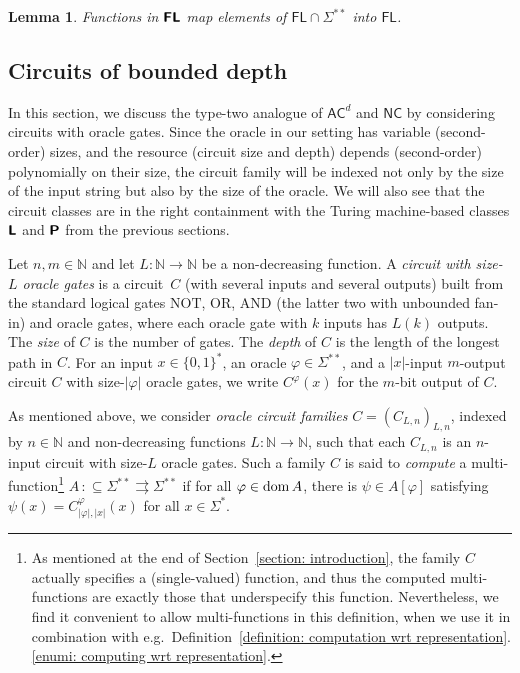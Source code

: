 \documentclass[conference]{IEEEtran}
\newcommand{\N}{\mathbb N}
\newcommand{\classonefont}[1]{\mathsf{#1}}
\newcommand{\classFL}{\classonefont{FL}}
\newcommand{\classNC}{\classonefont{NC}}
\newcommand{\classAC}{\classonefont{AC}}
\newcommand{\classtwofont}[1]{\text{\bfseries \sffamily \upshape #1}}
\newcommand{\classLtwo}{\classtwofont{L}}
\newcommand{\classFLtwo}{\classtwofont{FL}}
\newcommand{\classPtwo}{\classtwofont{P}}
\newcommand{\LM}{\varSigma ^{**}}
\newcommand{\dom}{\mathop{\rm dom}}
\newcommand{\OR}{\mathrm{OR}}
\newcommand{\NOT}{\mathrm{NOT}}
\newcommand{\AND}{\mathrm{AND}}
\newtheorem{lemma}[theorem]{Lemma}
\theoremstyle{definition}
\theoremstyle{remark}
\newcommand{\pcolon}{\mathpunct{\,:\subseteq}}
\begin{document}
\begin{lemma}
\label{lemma:Ltwo-maps-L-to-L}
 Functions in $\classFLtwo$ map 
 elements of $\classFL \cap \LM$
 into $\classFL$.
\end{lemma}


\subsection{Circuits of bounded depth}

In this section, we discuss the type-two analogue of $\classAC ^d$ and $\classNC$ 
by considering circuits with oracle gates.
Since the oracle in our setting has variable (second-order) sizes, 
and the resource (circuit size and depth) 
depends (second-order) polynomially on their size, 
the circuit family will be 
indexed not only by the size of the input string
but also by the size of the oracle. 
We will also see that the circuit classes are 
in the right containment with the 
Turing machine-based classes $\classLtwo$ and $\classPtwo$
from the previous sections. 

Let $n, m \in \N$ and let $L \colon \N \to \N$ be a non-decreasing function.
A \emph{circuit with size-$L$ oracle gates} is a circuit~$C$ 
(with several inputs and several outputs)
built from
the standard logical gates $\NOT$, $\OR$, $\AND$ (the latter two with unbounded fan-in) 
and oracle gates, 
where each oracle gate with $k$ inputs has $L (k)$ outputs.
The \emph{size} of $C$ is the number of gates.
The \emph{depth} of $C$ is the length of the longest path in $C$.
For an input $x \in \{0, 1\} ^*$, an oracle $\varphi \in \LM$, 
and a $|x|$-input $m$-output circuit $C$ with size-$|\varphi|$ oracle gates, 
we write $C^\varphi(x)$ for the $m$-bit output of $C$.

As mentioned above,
we consider \emph{oracle circuit families} $C = (C_{L,n})_{L,n}$, 
indexed by $n \in \N$ and non-decreasing functions $L \colon \N \to \N$,
such that each $C_{L, n}$ is an $n$-input circuit with size-$L$ oracle gates.
Such a family $C$ is said to
\emph{compute} a multi-function\footnote{%
As mentioned at the end of Section~\ref{section: introduction}, 
the family $C$ actually specifies a (single-valued) function, 
and thus the computed multi-functions are 
exactly those that underspecify this function. 
Nevertheless, we find it convenient to 
allow multi-functions in this definition, 
when we use it in combination with e.g.\ 
Definition~\ref{definition: computation wrt representation}.\ref{enumi: computing wrt representation}.
}
$A \pcolon \LM \rightrightarrows \LM$ if 
for all $\varphi \in \dom A$, there is $\psi \in A[\varphi]$ 
satisfying $\psi(x) = C_{|\varphi|, |x|}^\varphi(x)$ for all $x \in \varSigma^*$.
\end{document}

